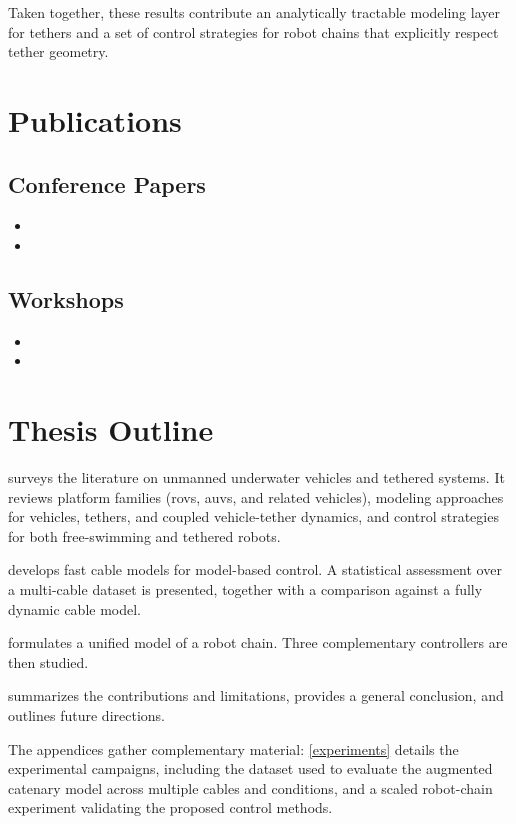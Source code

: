 Taken together, these results contribute an analytically tractable modeling layer for tethers and a
set of control strategies for robot chains that explicitly respect tether geometry.

\section{Publications}
\label{i_publications}

\subsection*{Conference Papers}

\begin{itemize}
	\item \AtNextCite{\setcounter{maxnames}{99}}
	\item \AtNextCite{\setcounter{maxnames}{99}}
\end{itemize}

\subsection*{Workshops}

\begin{itemize}
	\item \AtNextCite{\setcounter{maxnames}{99}}
	\item \AtNextCite{\setcounter{maxnames}{99}}
\end{itemize}

\section{Thesis Outline}\label{i_thesis_outline}

surveys the literature on unmanned underwater vehicles and tethered systems. It reviews platform
families (\acp{rov}, \acp{auv}, and related vehicles), modeling approaches for vehicles, tethers,
and coupled vehicle-tether dynamics, and control strategies for both free-swimming and tethered
robots.

develops fast cable models for model-based control. A statistical assessment over a multi-cable
dataset is presented, together with a comparison against a fully dynamic cable model.

formulates a unified model of a robot chain. Three complementary controllers are then studied.

summarizes the contributions and limitations, provides a general conclusion, and outlines future
directions.

The appendices gather complementary material: \cref{experiments} details the experimental
campaigns, including the dataset used to evaluate the augmented catenary model across multiple
cables and conditions, and a scaled robot-chain experiment validating the proposed control methods.
